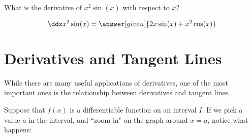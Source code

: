 \documentclass[nooutcomes]{ximera}
\begin{document}
 
\begin{question} 
  What is the derivative of $x^2 \sin(x) $ with respect to $x$?
  \begin{prompt} 
    \[
    \ddx x^2 \sin(x) = \answer[given]{2x \sin(x) +x^2 \cos(x)}
    \]
  \end{prompt}
\end{question}


\section{Derivatives and Tangent Lines}

While there are many useful applications of derivatives, one of the most important ones is the relationship between derivatives and tangent lines.

Suppose that $f(x)$ is a differentiable function on an interval $I$.  If we pick a value $a$ in the interval, and ``zoom in" on the graph around $x=a$, notice what happens:
\end{document}
